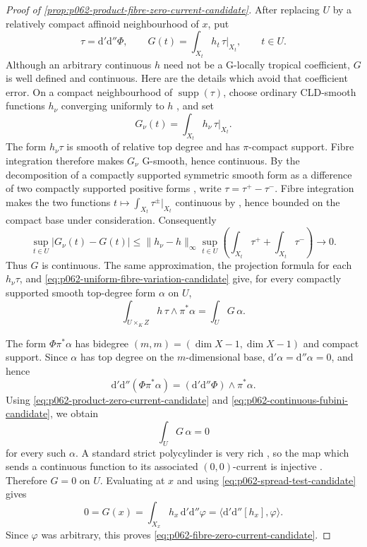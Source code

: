 \begin{proof}[Proof of \cref{prop:p062-product-fibre-zero-current-candidate}]
After replacing \(U\) by a relatively compact affinoid neighbourhood of
\(x\), put
\[
 \tau=\mathrm d'\mathrm d''\Phi,
 \qquad
 G(t)=\int_{X_t}h_t\,\tau|_{X_t},
 \qquad t\in U.
\]
Although an arbitrary continuous \(h\) need not be a G-locally tropical
coefficient, \(G\) is well defined and continuous. Here are the details
which avoid that coefficient error. On a compact neighbourhood of
\(\operatorname{supp}(\tau)\), choose ordinary CLD-smooth functions
\(h_\nu\) converging uniformly to \(h\)
\cite[Theorem~15.2.6]{CLD25}, and set
\[
                         G_\nu(t)=
                 \int_{X_t}h_\nu\,\tau|_{X_t}.
\]
The form \(h_\nu\tau\) is smooth of relative top degree and has
\(\pi\)-compact support. Fibre integration therefore makes \(G_\nu\)
G-smooth, hence continuous. By the decomposition of a compactly
supported symmetric smooth form as a difference of two compactly
supported positive forms \cite[Proposition~6.5.2(b)]{CLD25}, write
\(
 \tau=\tau^+-\tau^-.
\)
Fibre integration makes the two functions
\(
 t\mapsto\int_{X_t}\tau^\pm|_{X_t}
\)
continuous by \cite[Theorem~16.3.3(d)]{CLD25}, hence bounded on the
compact base under consideration.
Consequently
\begin{equation}\label{eq:p062-uniform-fibre-variation-candidate}
 \sup_{t\in U}|G_\nu(t)-G(t)|
 \leq \lVert h_\nu-h\rVert_\infty
       \sup_{t\in U}\left(
       \int_{X_t}\tau^+ +\int_{X_t}\tau^-\right)\longrightarrow0.
\end{equation}
Thus \(G\) is continuous. The same approximation, the projection formula
\cite[Theorem~16.5.4 and Corollary~16.5.5]{CLD25}
for each \(h_\nu\tau\), and
\eqref{eq:p062-uniform-fibre-variation-candidate} give, for every compactly
supported smooth top-degree form \(\alpha\) on \(U\),
\begin{equation}\label{eq:p062-continuous-fubini-candidate}
 \int_{U\times_KZ}h\,\tau\wedge\pi^*\alpha
                         =\int_U G\,\alpha.
\end{equation}

The form \(\Phi\pi^*\alpha\) has bidegree
\((m,m)=(\dim X-1,\dim X-1)\) and compact support. Since \(\alpha\) has
top degree on the \(m\)-dimensional base,
\(
 \mathrm d'\alpha=\mathrm d''\alpha=0
\), and hence
\[
 \mathrm d'\mathrm d''(\Phi\pi^*\alpha)
        =(\mathrm d'\mathrm d''\Phi)\wedge\pi^*\alpha.
\]
Using \eqref{eq:p062-product-zero-current-candidate} and
\eqref{eq:p062-continuous-fubini-candidate}, we obtain
\[
                              \int_U G\,\alpha=0
\]
for every such \(\alpha\). A standard strict polycylinder is very rich
\cite[Theorem~16.4.4(b)]{CLD25},
so the map which sends a continuous function to its associated
\((0,0)\)-current is injective
\cite[Corollary~7.3.12]{CLD25}. Therefore \(G=0\) on \(U\). Evaluating at
\(x\) and using \eqref{eq:p062-spread-test-candidate} gives
\[
 0=G(x)=\int_{X_x}h_x\,\mathrm d'\mathrm d''\varphi
       =\bigl\langle\mathrm d'\mathrm d''[h_x],\varphi\bigr\rangle.
\]
Since \(\varphi\) was arbitrary, this proves
\eqref{eq:p062-fibre-zero-current-candidate}.
\end{proof}

